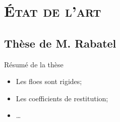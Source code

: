 

\section{\textsc{État de l'art}}


\subsection{Thèse de M. Rabatel}






\begin{frame}{Résumé de la thèse}
  \begin{itemize}
    \item Les floes sont rigides;
    \item Les coefficients de restitution;
    \item \dots
  \end{itemize}
\end{frame}

